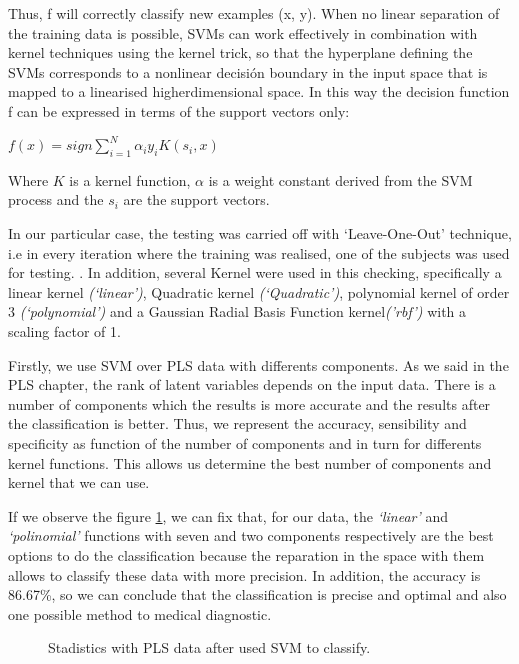 Thus, f will correctly classify new examples (x, y). When no linear separation of the training data is possible, SVMs can work effectively in combination with kernel techniques using the kernel trick, so that the hyperplane defining the SVMs corresponds to a nonlinear decisión boundary in the input space that is mapped to a linearised higherdimensional space. In this way the decision function f can be expressed in terms of the support vectors only\cite{Gorriz}:

\begin{center}
	$f(x) = sign{\sum_{i=1}^{N} \alpha_{i}y_{i}K(s_{i},x)}$
\end{center}

Where $K$ is a kernel function, $\alpha$ is a weight constant derived from the SVM process and the $s_{i}$ are the support vectors. 

In our particular case, the testing was carried off with ‘Leave-One-Out’ technique, i.e in every iteration where the training was realised, one of the subjects was used for testing. . In addition, several Kernel were used in this checking, specifically a linear kernel \textit{(‘linear’)}, Quadratic kernel \textit{(‘Quadratic’)}, polynomial kernel of order 3 \textit{(‘polynomial’)} and a Gaussian Radial Basis Function kernel\textit{('rbf')} with a scaling factor of 1.

Firstly, we use SVM over PLS data with differents components. As we said in the PLS chapter, the rank of latent variables depends on the input data. There is a number of components which the results is more accurate and the results after the classification is better. Thus, we represent the accuracy, sensibility and specificity as function of the number of components and in turn for differents kernel functions. This allows us determine the best number of components and  kernel that we can use.

If we observe the figure \ref{fig:stadistics_PLS}, we can fix that, for our data, the \textit{‘linear’} and \textit{‘polinomial’} functions with seven and two components respectively are the best options to do the classification because the reparation in the space with them allows to classify these data with more precision.  In addition, the accuracy is 86.67\%, so we can conclude that the classification is precise and optimal and also one possible method to medical diagnostic.

\begin{figure}[H]
	\centering
	\caption{Stadistics with PLS data after used SVM to classify.}
	\label{fig:stadistics_PLS}
\end{figure}


